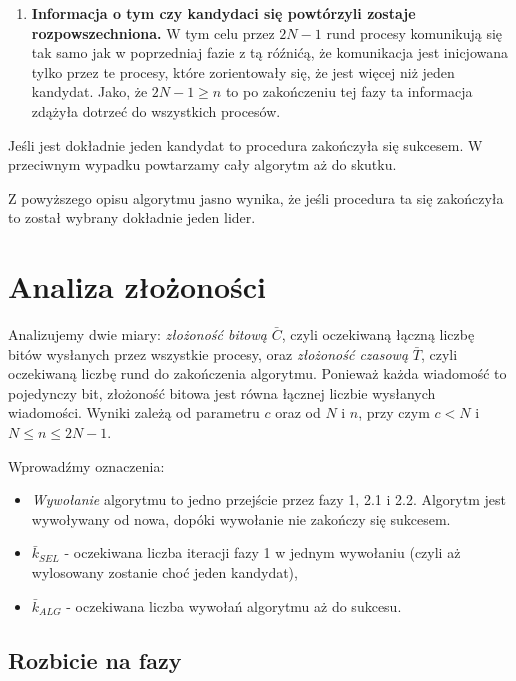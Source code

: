 \documentclass[11pt,a4paper]{article}
\begin{document}
\begin{enumerate}
\begin{enumerate}
                jeden kandydat dokładnie wtedy gdy istnieje proces który o tym wie
            \item[2.2] \textbf {Informacja o tym czy kandydaci się powtórzyli zostaje rozpowszechniona.} W tym celu przez $2N-1$ rund procesy komunikują się tak samo jak w poprzedniaj fazie 
            z tą róźnićą, że komunikacja jest inicjowana tylko przez te procesy, które zorientowały się, że jest więcej niż jeden kandydat. Jako, że $2N-1 \geq n$ to po zakończeniu tej fazy ta informacja zdążyła dotrzeć do wszystkich procesów.
        \end{enumerate}
        Jeśli jest dokładnie jeden kandydat to procedura zakończyła się sukcesem. W przeciwnym wypadku powtarzamy cały algorytm aż do skutku.
\end{enumerate}

Z powyższego opisu algorytmu jasno wynika, że jeśli procedura ta się zakończyła to został wybrany dokładnie jeden lider. 

\section{Analiza złożoności}

Analizujemy dwie miary: \emph{złożoność bitową} $\bar{C}$, czyli oczekiwaną łączną liczbę bitów wysłanych przez wszystkie procesy,
oraz \emph{złożoność czasową} $\bar{T}$, czyli oczekiwaną liczbę rund do zakończenia algorytmu. Ponieważ każda wiadomość to pojedynczy bit,
złożoność bitowa jest równa łącznej liczbie wysłanych wiadomości. Wyniki zależą od parametru $c$ oraz od $N$ i $n$, przy czym $c < N$ i $N \leq n \leq 2N-1$.

Wprowadźmy oznaczenia:
\begin{itemize}
    \item \emph{Wywołanie} algorytmu to jedno przejście przez fazy 1, 2.1 i 2.2. Algorytm jest wywoływany od nowa, dopóki wywołanie nie zakończy się sukcesem.
    \item $\bar{k}_{SEL}$ - oczekiwana liczba iteracji fazy 1 w jednym wywołaniu (czyli aż wylosowany zostanie choć jeden kandydat),
    \item $\bar{k}_{ALG}$ - oczekiwana liczba wywołań algorytmu aż do sukcesu.
\end{itemize}

\subsection{Rozbicie na fazy}
\end{document}
